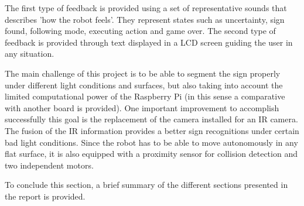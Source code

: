 The first type of feedback is provided using a set of representative sounds that describes 'how the robot feels'. They represent states such as uncertainty, sign found, following mode, executing action and game over. The second type of feedback is provided through text displayed in a LCD screen guiding the user in any situation.

The main challenge of this project is to be able to segment the sign properly under different light conditions and surfaces, but also taking into account the limited computational power of the Raspberry Pi (in this sense a comparative with another board is provided). One important improvement to accomplish successfully this goal is the replacement of the camera installed for an IR camera. The fusion of the IR information provides a better sign recognitions under certain bad light conditions. Since the robot has to be able to move autonomously in any flat surface, it is also equipped with a proximity sensor for collision detection and two independent motors.

To conclude this section, a brief summary of the different sections presented in the report is provided. 